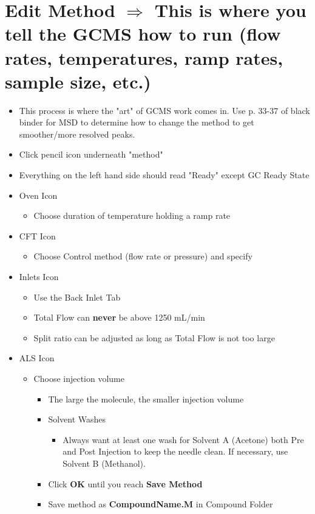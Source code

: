 \documentclass[letterpaper,11pt]{article}
\begin{document}
\section{Edit Method $\Longrightarrow$ This is where you tell the GCMS how to run (flow rates, temperatures, ramp rates, sample size, etc.)}
	\begin{itemize}
	\item This process is where the "art" of GCMS work comes in. Use p. 33-37 of black binder for MSD to determine how to change the method to get smoother/more resolved peaks.
    \item Click pencil icon underneath "method"
    \item Everything on the left hand side should read "Ready" except GC Ready State
    \item Oven Icon
    	\begin{itemize}
    	\item Choose duration of temperature holding a ramp rate 
        \end{itemize}
    \item CFT Icon
    	\begin{itemize}
    	\item Choose Control method (flow rate or pressure) and specify
        \end{itemize}
    \item Inlets Icon
    	\begin{itemize}
    	\item Use the Back Inlet Tab
        \item Total Flow can \textbf{never} be above 1250 mL/min
        \item Split ratio can be adjusted as long as Total Flow is not too large
        \end{itemize}
    \item ALS Icon
    	\begin{itemize}
    	\item Choose injection volume
        	\begin{itemize}
        	\item The large the molecule, the smaller injection volume
        	\end{itemize}
		\begin{itemize}
		\item Solvent Washes
        	\begin{itemize}
        	\item Always want at least one wash for Solvent A (Acetone) both Pre and Post Injection to keep the needle clean. If necessary, use Solvent B (Methanol).
        	\end{itemize}
        \item Click \textbf{OK} until you reach \textbf{Save Method}
        \item Save method as \textbf{CompoundName.M} in Compound Folder
		\end{itemize}
    \end{itemize}
\end{itemize}
\end{document}
